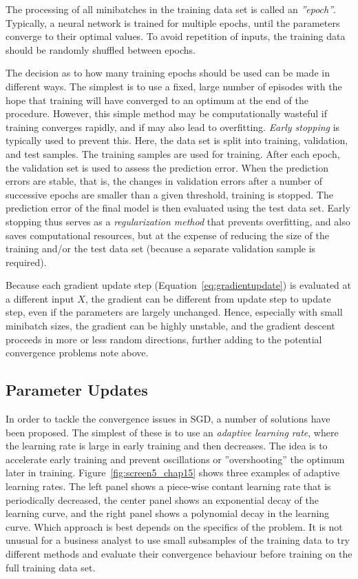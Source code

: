 The processing of all minibatches in the training data set is called an \emph{''epoch''}. Typically, a neural network is trained for multiple epochs, until the parameters converge to their optimal values. To avoid repetition of inputs, the training data should be randomly shuffled between epochs.

The decision as to how many training epochs should be used can be made in different ways. The simplest is to use a fixed, large number of episodes with the hope that training will have converged to an optimum at the end of the procedure. However, this simple method may be computationally wasteful if training converges rapidly, and if may also lead to overfitting. \emph{Early stopping} is typically used to prevent this. Here, the data set is split into training, validation, and test samples. The training samples are used for training. After each epoch, the validation set is used to assess the prediction error. When the prediction errors are stable, that is, the changes in validation errors after a number of successive epochs are smaller than a given threshold, training is stopped. The prediction error of the final model is then evaluated using the test data set. Early stopping thus serves as a \emph{regularization method} that prevents overfitting, and also saves computational resources, but at the expense of reducing the size of the training and/or the test data set (because a separate validation sample is required).

Because each gradient update step (Equation~\ref{eq:gradientupdate}) is evaluated at a different input $X$, the gradient can be different from update step to update step, even if the parameters are largely unchanged. Hence, especially with small minibatch sizes, the gradient can be highly unstable, and the gradient descent proceeds in more or less random directions, further adding to the potential convergence problems note above.

\subsection{Parameter Updates}

In order to tackle the convergence issues in SGD, a number of solutions have been proposed. The simplest of these is to use an \emph{adaptive learning rate}, where the learning rate is large in early training and then decreases. The idea is to accelerate early training and prevent oscillations or ''overshooting'' the optimum later in training. Figure~\ref{fig:screen5_chap15} shows three examples of adaptive learning rates. The left panel shows a piece-wise contant learning rate that is periodically decreased, the center panel shows an exponential decay of the learning curve, and the right panel shows a polynomial decay in the learning curve. Which approach is best depends on the specifics of the problem. It is not unusual for a business analyst to use small subsamples of the training data to try different methods and evaluate their convergence behaviour before training on the full training data set.

